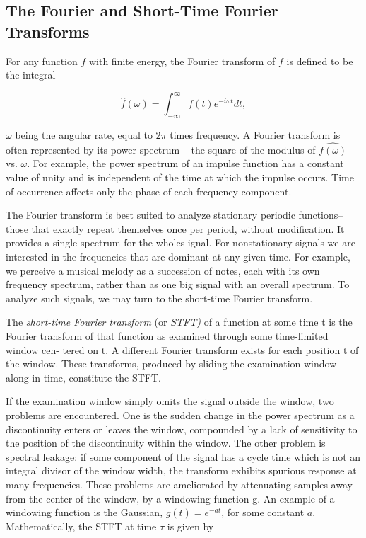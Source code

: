 \documentclass[a4paper,12pt]{article}
\begin{document}
\subsection{The Fourier and Short-Time Fourier Transforms}

For any function \(f\) with finite energy, the Fourier transform of \(f\) is defined to be the integral

\[
\hat{f}(\omega) = \int_{-\infty}^{\infty}f(t)e^{-i \omega t} dt,
\]

\(\omega\) being the angular rate, equal to \(2\pi\) times frequency. A Fourier transform is often represented by its
power spectrum -- the square of the modulus of \(\hat{f(\omega)}\) vs. \(\omega\). For example, the power spectrum of an impulse function has a constant value of unity and is independent of the time at which the impulse occurs. Time of
occurrence affects only the phase of each frequency component.

The Fourier transform is best suited to analyze stationary periodic functions--those that exactly repeat themselves
once per period, without modification. It provides a single spectrum for the wholes ignal. For nonstationary signals
we are interested in the frequencies that are dominant at any given time. For example, we perceive a musical melody
as a succession of notes, each with its own frequency spectrum, rather than as one big signal with an overall spectrum.
To analyze such signals, we may turn to the short-time Fourier transform.

The \emph{short-time Fourier transform} (or \emph{STFT)} of a function at some time t is the Fourier transform of that
function as examined through some time-limited window cen- tered on t. A different Fourier transform exists for each
position t of the window. These transforms, produced by sliding the examination window along in time, constitute the
STFT.

If the examination window simply omits the signal outside the window, two problems are encountered. One is the sudden
change in the power spectrum as a discontinuity enters or leaves the window, compounded by a lack of sensitivity to the
position of the discontinuity within the window. The other problem is spectral leakage: if some component of the signal
has a cycle time which is not an integral divisor of the window width, the transform exhibits spurious response at many
frequencies. These problems are ameliorated by attenuating samples away from the center of the window, by a windowing
function g. An example of a windowing function is the Gaussian, \(g(t) = e^{-at}\), for some constant \(a\).
Mathematically, the STFT at time \(\tau\) is given by
\end{document}
